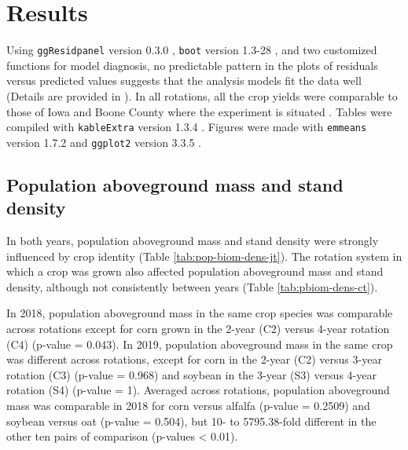 \documentclass[
]{article}
\begin{document}
\hypertarget{results}{%
\section*{Results}\label{results}}

Using \texttt{ggResidpanel} version 0.3.0  \citep{goodeGgResidpanelPanelsInteractive2019}, \texttt{boot} version 1.3-28 \citep{cantyBootBootstrapFunctions2021}, and two customized functions for model diagnosis, no predictable pattern in the plots of residuals versus predicted values suggests that the analysis models fit the data well (Details are provided in \cite{nguyenDataImpactCropping2022}). In all rotations, all the crop yields were comparable to those of Iowa and Boone County where the experiment is situated \citep{huntFossilEnergyUse2020, nguyenWeedCommunityCompositioninreview}. Tables were compiled with \texttt{kableExtra} version 1.3.4 \citep{zhuKableExtraConstructComplex2021}. Figures were made with \texttt{emmeans} version 1.7.2 \citep{lenthEmmeansEstimatedMarginal2021} and \texttt{ggplot2} version 3.3.5 \citep{wickhamGgplot2CreateElegant2021}.

\hypertarget{population-aboveground-mass-and-stand-density}{%
\subsection*{Population aboveground mass and stand density}\label{population-aboveground-mass-and-stand-density}}

In both years, population aboveground mass and stand density were strongly influenced by crop identity (Table \ref{tab:pop-biom-dens-jt}). The rotation system in which a crop was grown also affected population aboveground mass and stand density, although not consistently between years (Table \ref{tab:pbiom-dens-ct}).

In 2018, population aboveground mass in the same crop species was comparable across rotations except for corn grown in the 2-year (C2) versus 4-year rotation (C4) (p-value = 0.043). In 2019, population aboveground mass in the same crop was different across rotations, except for corn in the 2-year (C2) versus 3-year rotation (C3) (p-value = 0.968) and soybean in the 3-year (S3) versus 4-year rotation (S4) (p-value = 1). Averaged across rotations, population aboveground mass was comparable in 2018 for corn versus alfalfa (p-value = 0.2509) and soybean versus oat (p-value = 0.504), but 10- to 5795.38-fold different in the other ten pairs of comparison (p-values \textless{} 0.01).
\end{document}
